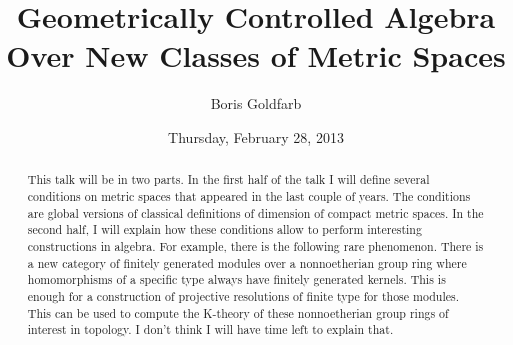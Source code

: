 \documentclass{UAmathtalk}
\author{Boris Goldfarb}
\title{Geometrically Controlled Algebra\\ Over New Classes of Metric Spaces}
\date{Thursday, February 28, 2013}
\begin{document}
\maketitle

\begin{abstract}
This talk will be in two parts.  In the first half of the talk I will define several conditions on metric spaces that appeared in the last couple of years.  The conditions are global versions of classical definitions of dimension of compact metric spaces.  In the second half, I will explain how these conditions allow to perform interesting constructions in algebra.  For example, there is the following rare phenomenon.  There is a new category of finitely generated modules over a nonnoetherian group ring where homomorphisms of a specific type always have finitely generated kernels.  This is enough for a construction of projective resolutions of finite type for those modules.  This can be used to compute the K-theory of these nonnoetherian group rings of interest in topology.  I don't think I will have time left to explain that.
\end{abstract}
\end{document}
